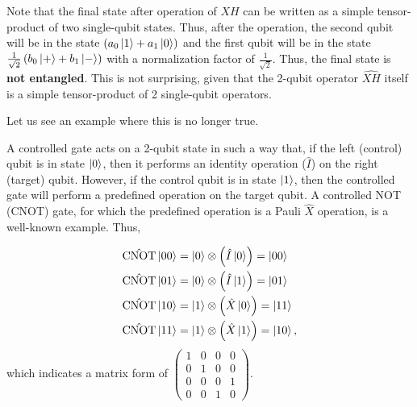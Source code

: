 \documentclass[12pt,oneside]{book}
\begin{document}
Note that the final state after operation of $\hat{XH}$ can be written as a simple tensor-product of two single-qubit states. Thus, after the operation, the second qubit will be in the state $\left(a_0\ket{1}+a_1\ket{0}\right)$ and the first qubit will be in the state $\frac{1}{\sqrt{2}} \left(b_0\ket{+}+b_1\ket{-}\right)$ with a normalization factor of $\frac{1}{\sqrt{2}}$. Thus, the final state is \textbf{not entangled}. This is not surprising, given that the 2-qubit operator $\hat{XH}$ itself is a simple tensor-product of 2 single-qubit operators.

Let us see an example where this is no longer true. 

A controlled gate acts on a 2-qubit state in such a way that, if the left (control) qubit is in state $\ket{0}$, then it performs an identity operation ($\hat{I}$) on the right (target) qubit. However, if the control qubit is in state $\ket{1}$, then the controlled gate will perform a predefined operation on the target qubit. A controlled NOT (CNOT) gate, for which the predefined operation is a Pauli $\hat{X}$ operation, is a well-known example. Thus,

\begin{align*}
    \hat{\mathrm{CNOT}}\ket{00} &{}= \ket{0} \otimes \left(\hat{I}\ket{0}\right)= \ket{00}\\
    \hat{\mathrm{CNOT}}\ket{01} &{}= \ket{0} \otimes \left(\hat{I}\ket{1}\right) = \ket{01}\\
    \hat{\mathrm{CNOT}}\ket{10} &{}= \ket{1} \otimes \left(\hat{X}\ket{0}\right) = \ket{11}\\
    \hat{\mathrm{CNOT}}\ket{11} &{}=  \ket{1} \otimes \left(\hat{X}\ket{1}\right) = \ket{10},\\
\end{align*}
which indicates a matrix form of $\begin{pmatrix}
    1 & 0 & 0 & 0\\ 0 & 1 & 0 & 0\\0 & 0 & 0 & 1\\ 0 & 0 & 1 & 0
\end{pmatrix}$.
\end{document}

